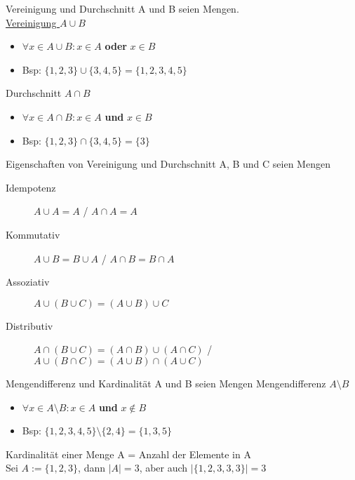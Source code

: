 \begin{frame}{Vereinigung und Durchschnitt}
	A und B seien Mengen.\\
	\underline{Vereinigung $A\cup B$}
	\begin{itemize}
		\item $\forall x\in A\cup B: x\in A$ \textbf{oder} $x\in B$
		\item Bsp: $\{1, 2, 3\}\cup \{3, 4, 5\} = \{1, 2, 3, 4, 5\}$
	\end{itemize}
	Durchschnitt $A\cap B$
	\begin{itemize}
		\item $\forall x\in A\cap B: x\in A$ \textbf{und} $x\in B$
		\item Bsp: $\{1, 2, 3\}\cap \{3, 4, 5\} = \{3\}$
	\end{itemize}
\end{frame}

\begin{frame}{Eigenschaften von Vereinigung und Durchschnitt}
	A, B und C seien Mengen
	\begin{description}
		\item[Idempotenz] $A\cup A = A$ / $A\cap A = A$
		\item[Kommutativ] $A\cup B = B\cup A$ / $A\cap B = B\cap A$
		\item[Assoziativ] $A\cup (B\cup C) = (A\cup B) \cup C$
		\item[Distributiv] $A\cap (B\cup C) = (A\cap B)\cup (A\cap C)$ / $A\cup (B\cap C) = (A\cup B)\cap (A\cup C)$
	\end{description}
\end{frame}

\begin{frame}{Mengendifferenz und Kardinalität}
	A und B seien Mengen
	Mengendifferenz $A\setminus B$
	\begin{itemize}
		\item $\forall x\in A\setminus B: x\in A$ \textbf{und} $x\notin B$
		\item Bsp: $\{1, 2, 3, 4, 5\} \setminus \{2, 4\} = \{1, 3, 5\}$
	\end{itemize}
	Kardinalität einer Menge A = Anzahl der Elemente in A\\
	Sei $A := \{1, 2, 3\}$, dann $\lvert A\rvert = 3$, aber auch $\lvert \{1, 2, 3, 3, 3\}\rvert = 3$
\end{frame}


